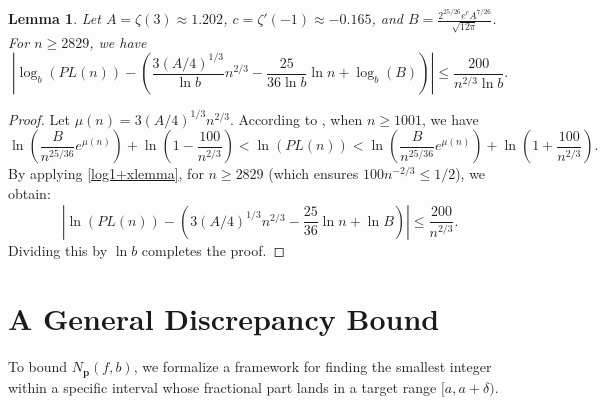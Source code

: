 \documentclass[12pt]{amsart}
\numberwithin{equation}{section}
\newtheorem{lem}[thm]{Lemma}
\begin{document}
\begin{lem}
\label{logbplanepartitionalmeqn}
Let $A = \zeta(3)\approx 1.202$, $c = \zeta'(-1)\approx -0.165$, and $B = \frac{2^{25/26}e^{c}A^{7/26}}{\sqrt{12\pi}}$. For $n \geq 2829$, we have
\begin{equation*}
\left|\log_{b}(PL(n)) - \left(\frac{3(A/4)^{1/3}}{\ln b}n^{2/3}-\frac{25}{36 \ln b}\ln n + \log_{b}(B)\right)\right| \leq \frac{200}{n^{2/3}\ln b}.
\end{equation*}
\end{lem}
\begin{proof}
Let $\mu(n) = 3(A/4)^{1/3}n^{2/3}$. According to \cite[Lemma 1]{LucaPart1}, when $n \geq 1001$, we have
\begin{equation*}
\ln\left(\frac{B}{n^{25/36}}e^{\mu(n)}\right)+\ln\left(1-\frac{100}{n^{2/3}}\right)<\ln(PL(n)) <\ln\left(\frac{B}{n^{25/36}}e^{\mu(n)}\right)+\ln\left(1+\frac{100}{n^{2/3}}\right).
\end{equation*}
By applying \eqref{log1+xlemma}, for $n \geq 2829$ (which ensures $100n^{-2/3} \le 1/2$), we obtain:
\begin{equation*}
\left|\ln(PL(n)) - \left(3(A/4)^{1/3}n^{2/3}-\frac{25}{36}\ln n + \ln B\right)\right| \leq \frac{200}{n^{2/3}}.
\end{equation*}
Dividing this by $\ln b$ completes the proof.
\end{proof}

\section{A General Discrepancy Bound}

To bound $N_{\mathbf{p}}(f,b)$, we formalize a framework for finding the smallest integer within a specific interval whose fractional part lands in a target range $[a, a+\delta)$. 
\end{document}
